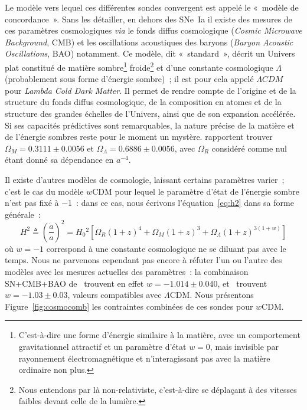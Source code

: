 \documentclass[../main/main.tex]{subfiles}
\begin{document}
Le modèle vers lequel ces différentes sondes convergent est appelé le «~modèle
de concordance~». Sans les détailler, en dehors des SNe~Ia il existe des mesures
de ces paramètres cosmologiques \textit{via} le fonds diffus cosmologique
(\textit{Cosmic Microwave Background}, CMB) et les oscillations acoustiques des
baryons (\textit{Baryon Acoustic Oscillations}, BAO) notamment. Ce modèle, dit
«~standard~», décrit un Univers plat constitué de matière
sombre\footnote{C'est-à-dire une forme d'énergie similaire à la matière, avec un
    comportement gravitationnel attractif et un paramètre d'état $w=0$, mais
    invisible par rayonnement électromagnétique et n'interagissant pas avec la
matière ordinaire non plus.} froide\footnote{Nous entendons par là
    non-relativiste, c'est-à-dire se déplaçant à des vitesses faibles devant
celle de la lumière.} et d'une constante cosmologique $\Lambda$ (probablement
sous forme d'énergie sombre)~; il est pour cela appelé $\Lambda CDM$ pour
\textit{Lambda Cold Dark Matter}. Il permet de rendre compte de l'origine et
de la structure du fonds diffus cosmologique, de la composition en atomes et
de la structure des grandes échelles de l'Univers, ainsi que de son
expansion accélérée. Si ses capacités prédictives sont remarquables, la
nature précise de la matière et de l'énergie sombres reste pour le moment un
mystère. \cite{planck2018} rapportent trouver $\Omega_M = \num{0.3111} \pm
\num{0.0056}$ et $\Omega_\Lambda = \num{0.6886} \pm \num{0.0056}$, avec
$\Omega_R$ considéré comme nul étant donné sa dépendance en $a^{-4}$.

Il existe d'autres modèles de cosmologie, laissant certains paramètres varier~;
c'est le cas du modèle $w$CDM pour lequel le paramètre d'état de l'énergie
sombre n'est pas fixé à \num{-1}~: dans ce cas, nous écrivons
l'équation~\ref{eq:h2} dans sa forme générale~:
\begin{equation}\label{eq:h2w}
    H^2 \triangleq \left( \frac{\dot{a}}{a} \right)^2 =
    H_0{}^2 \left[ \Omega_R \left( 1+z \right)^4 +
        \Omega_M \left( 1+z \right)^3 +
    \Omega_\Lambda \left( 1+z \right)^{3(1+w)} \right]
\end{equation}
où $w=-1$ correspond à une constante cosmologique ne se diluant pas avec le
temps. Nous ne parvenons cependant pas encore à réfuter l'un ou l'autre des
modèles avec les mesures actuelles des paramètres~: la combinaison SN+CMB+BAO
de~\cite{scolnic2018} trouvent en effet $w = \num{-1.014}\pm\num{0.040}$,
et~\cite{planck2018} trouvent $w = \num{-1.03}\pm\num{0.03}$, valeurs
compatibles avec $\Lambda$CDM. Nous présentons Figure~\ref{fig:cosmocomb} les
contraintes combinées de ces sondes pour $w$CDM.
\end{document}
